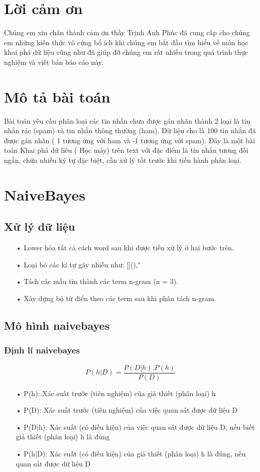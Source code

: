 \documentclass[a4paper,11pt]{report}
\begin{document}
\chapter*{Lời cảm ơn}
Chúng em xin chân thành cảm ơn thầy Trịnh Anh Phúc đã cung cấp cho chúng em những kiến thức vô cứng bổ ích khi chúng em bắt đầu tìm hiểu về môn học khai phá dữ liệu cũng như đã giúp đỡ chúng em rất nhiều trong quá trình thực nghiệm và viết bản báo cáo này.
\chapter{Mô tả bài toán}
Bài toán yêu cầu phân loại các tin nhắn chưa được gán nhãn thành 2 loại là tin nhắn rác (spam) và tin nhắn thông thường (ham). Dữ liệu cho là 100 tin nhắn đã được gán nhãn ( 1 tương ứng với ham và -1 tương ứng với spam). Đây là một bài toán Khai phá dữ liêu ( Học máy) trên text với đặc điểm là tin nhắn tương đối ngắn, chứa nhiều ký tự đặc biệt, cần xử lý tốt trước khi tiến hành phân loại.
\chapter{NaiveBayes}
\section{Xử lý dữ liệu}
\begin{itemize}
\item[•] Lower hóa tất cả cách word sau khi được tiền xử lý ở hai bước trên.
\item[•] Loại bỏ các kí tự gây nhiễu như: [](),"
\item[•] Tách các mẫu tin thành các term n-gram (n = 3).
\item[•] Xây dựng bộ từ điển theo các term sau khi phân tách n-gram.
\end{itemize}
\section{Mô hình naivebayes}
\subsection{Định lí naivebayes}
\begin{displaymath}
P(h|D) = \frac{P(D|h).P(h)}{P(D)}
\end{displaymath} 
\begin{itemize}
\item[•] P(h): Xác suất trước (tiên nghiệm) của giả thiết (phân loại) h
\item[•] P(D): Xác suất trước (tiên nghiệm) của việc quan sát được
dữ liệu D
\item[•] P(D|h): Xác suất (có điều kiện) của việc quan sát được dữ
liệu D, nếu biết giả thiết (phân loại) h là đúng
\item[•] P(h|D): Xác suất (có điều kiện) của giả thiết (phân loại) h là đúng, nếu quan sát được dữ liệu D
\end{itemize}
\end{document}
